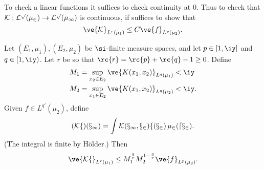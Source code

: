 To check a linear functions it suffices to check continuity at 0. %
Thus to check that $\cal K:L^p(\mu_2)\to L^p(\mu_1)$ is continuous, if suffices to show that
\begin{equation}\label{lfuncineq}
\ve{\cal K}_{L^r(\mu_1)}\le C\ve{f}_{L^p(\mu_2)}.
\end{equation}
\begin{thm}\label{lspacefuncineq}
Let $(E_1,\mu_1),(E_2,\mu_2)$ be $\si$-finite measure spaces, and let $p\in[1,\iy]$ and $q\in [1,\iy)$. Let $r$ be so that $\rc{r}=\rc{p}+\rc{q}-1\ge 0$. Define
\begin{align*}
M_1&=\sup_{x_2\in E_2} \ve{K(x_1,x_2)}_{L^q(\mu_1)}<\iy\\
M_2&=\sup_{x_1\in E_2} \ve{K(x_1,x_2)}_{L^q(\mu_2)}<\iy.
\end{align*}
Given $f\in L^{q'}(\mu_2)$, define
\[
(\cal K f)(x_1)=\int K(x_1,x_2)f(x_2)\,\mu_2(dx_2).
\]
(The integral is finite by H\"older.)
Then
\[
\ve{\cal K f}_{L^r(\mu_1)}\le M_1^{\frac qr}M_2^{1-\frac qr}\ve{f}_{L^p(\mu_2)}.
\]
\end{thm}
